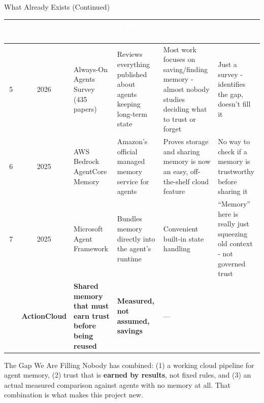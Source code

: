 \documentclass{beamer}
\begin{document}
\begin{frame}{What Already Exists (Continued)}
\scriptsize
\setlength{\tabcolsep}{3pt}
\renewcommand{\arraystretch}{1.25}

\begin{tabular}{|c|c|p{2.8cm}|p{2.5cm}|p{2.4cm}|p{2.2cm}|}
\hline
\rowcolor{blue!70}
\textcolor{white}{\textbf{\#}} &
\textcolor{white}{\textbf{Year}} &
\textcolor{white}{\textbf{Work}} &
\textcolor{white}{\textbf{What It Does}} &
\textcolor{white}{\textbf{Useful Finding}} &
\textcolor{white}{\textbf{What It Misses}} \\
\hline

\rowcolor{blue!8}
5 & 2026 &
Always-On Agents Survey (435 papers) &
Reviews everything published about agents keeping long-term state &
Most work focuses on saving/finding memory - almost nobody studies deciding what to trust or forget &
Just a survey - identifies the gap, doesn't fill it \\
\hline

6 & 2025 &
AWS Bedrock AgentCore Memory &
Amazon's official managed memory service for agents &
Proves storage and sharing memory is now an easy, off-the-shelf cloud feature &
No way to check if a memory is trustworthy before sharing it \\
\hline

\rowcolor{blue!8}
7 & 2025 &
Microsoft Agent Framework &
Bundles memory directly into the agent's runtime &
Convenient built-in state handling &
``Memory'' here is really just squeezing old context - not governed trust \\
\hline

\rowcolor{blue!25}
\multicolumn{2}{|c|}{\textbf{Ours}} &
\textbf{ActionCloud} &
\textbf{Shared memory that must earn trust before being reused} &
\textbf{Measured, not assumed, savings} &
--- \\
\hline

\end{tabular}

\vspace{0.2cm}

\begin{block}{The Gap We Are Filling}
Nobody has combined: (1) a working cloud pipeline for agent memory, (2) trust that is \textbf{earned by results}, not fixed rules, and (3) an actual measured comparison against agents with no memory at all. That combination is what makes this project new.
\end{block}

\end{frame}
\end{document}
